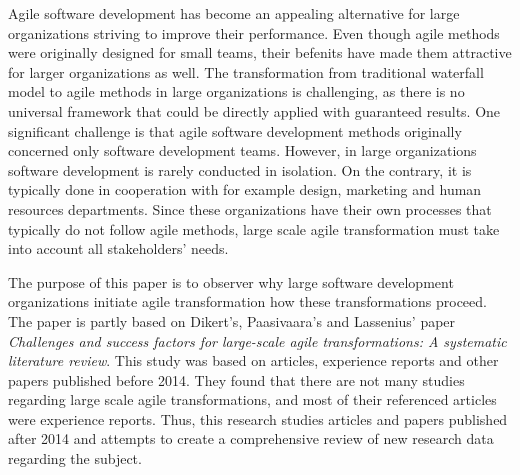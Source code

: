 Agile software development has become an appealing alternative for
large organizations striving to improve their performance. Even
though agile methods were originally designed for small teams, their
befenits have made them attractive for larger organizations as well.
The transformation from traditional waterfall model to agile methods
in large organizations is challenging, as there is no universal
framework that could be directly applied with guaranteed results.
One significant challenge is that agile software development methods
originally concerned only software development teams. However, in
large organizations software development is rarely conducted in
isolation. On the contrary, it is typically done in cooperation with for
example design, marketing and human resources departments. Since these
organizations have their own processes that typically do not follow
agile methods, large scale agile transformation must take into account
all stakeholders' needs.

The purpose of this paper is to observer why large software development
organizations initiate agile transformation how these transformations
proceed. The paper is partly based on Dikert's, Paasivaara's and
Lassenius' paper \textit{Challenges and success factors for large-scale
agile transformations: A systematic literature review}. This study
was based on articles, experience reports and other papers published
before 2014. They found that there are not many studies regarding large
scale agile transformations, and most of their referenced articles were
experience reports. Thus, this research studies articles and papers
published after 2014 and attempts to create a comprehensive review of
new research data regarding the subject.
